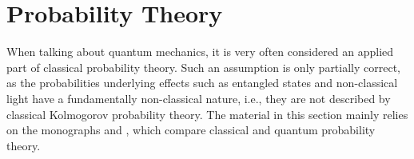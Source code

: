 \chapter{Probability Theory}
When talking about quantum mechanics, it is very often considered an applied part of classical probability theory. Such an assumption is only partially correct, as the probabilities underlying effects such as entangled states and non-classical light have a fundamentally non-classical nature, i.e., they are not described by classical Kolmogorov probability theory. The material in this section mainly relies on the monographs \cite{bHolevo2003} and \cite{bHolevo2003add}, which compare classical and quantum probability theory.




